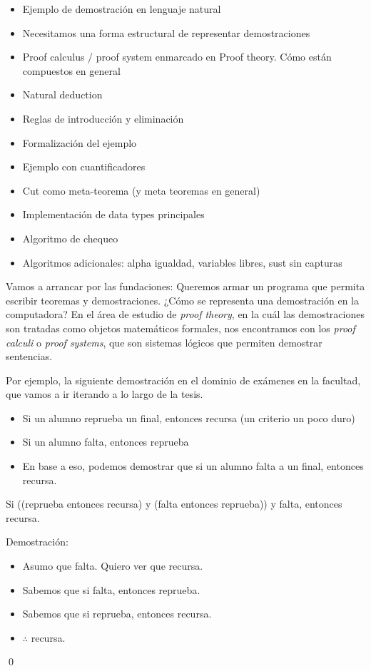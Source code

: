 \begin{itemize}
    \item Ejemplo de demostración en lenguaje natural
    \item Necesitamos una forma estructural de representar demostraciones
    \item Proof calculus / proof system enmarcado en Proof theory. Cómo están
    compuestos en general
    \item Natural deduction
    \item Reglas de introducción y eliminación
    \item Formalización del ejemplo
    \item Ejemplo con cuantificadores
    \item Cut como meta-teorema (y meta teoremas en general)
    \item Implementación de data types principales
    \item Algoritmo de chequeo
    \item Algoritmos adicionales: alpha igualdad, variables libres, sust sin capturas
\end{itemize}

Vamos a arrancar por las fundaciones: Queremos armar un programa que permita
escribir teoremas y demostraciones. ¿Cómo se representa una demostración en la
computadora? En el área de estudio de \textit{proof theory}, en la cuál las
demostraciones son tratadas como objetos matemáticos formales, nos encontramos
con los \textit{proof calculi} o \textit{proof systems}, que son sistemas
lógicos que permiten demostrar sentencias.

Por ejemplo, la siguiente demostración en el dominio de exámenes en la facultad,
que vamos a ir iterando a lo largo de la tesis.

\begin{itemize}
    \item Si un alumno reprueba un final, entonces recursa (un criterio un poco duro)
    \item Si un alumno falta, entonces reprueba
    \item En base a eso, podemos demostrar que si un alumno falta a un final,
    entonces recursa.
\end{itemize}

\begin{ejemplo}
    Si ((reprueba entonces recursa) y (falta entonces reprueba)) y falta, entonces recursa.

    Demostración:
\begin{itemize}
    \item Asumo que falta. Quiero ver que recursa.
    \item Sabemos que si falta, entonces reprueba.
    \item Sabemos que si reprueba, entonces recursa.
    \item $\therefore$ recursa.
\end{itemize}
    \qed
\end{ejemplo}

